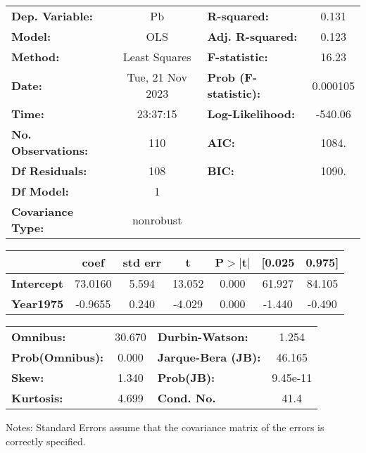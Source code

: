 \begin{center}
\begin{tabular}{lclc}
\toprule
\textbf{Dep. Variable:}    &        Pb        & \textbf{  R-squared:         } &     0.131   \\
\textbf{Model:}            &       OLS        & \textbf{  Adj. R-squared:    } &     0.123   \\
\textbf{Method:}           &  Least Squares   & \textbf{  F-statistic:       } &     16.23   \\
\textbf{Date:}             & Tue, 21 Nov 2023 & \textbf{  Prob (F-statistic):} &  0.000105   \\
\textbf{Time:}             &     23:37:15     & \textbf{  Log-Likelihood:    } &   -540.06   \\
\textbf{No. Observations:} &         110      & \textbf{  AIC:               } &     1084.   \\
\textbf{Df Residuals:}     &         108      & \textbf{  BIC:               } &     1090.   \\
\textbf{Df Model:}         &           1      & \textbf{                     } &             \\
\textbf{Covariance Type:}  &    nonrobust     & \textbf{                     } &             \\
\bottomrule
\end{tabular}
\begin{tabular}{lcccccc}
                   & \textbf{coef} & \textbf{std err} & \textbf{t} & \textbf{P$> |$t$|$} & \textbf{[0.025} & \textbf{0.975]}  \\
\midrule
\textbf{Intercept} &      73.0160  &        5.594     &    13.052  &         0.000        &       61.927    &       84.105     \\
\textbf{Year1975}  &      -0.9655  &        0.240     &    -4.029  &         0.000        &       -1.440    &       -0.490     \\
\bottomrule
\end{tabular}
\begin{tabular}{lclc}
\textbf{Omnibus:}       & 30.670 & \textbf{  Durbin-Watson:     } &    1.254  \\
\textbf{Prob(Omnibus):} &  0.000 & \textbf{  Jarque-Bera (JB):  } &   46.165  \\
\textbf{Skew:}          &  1.340 & \textbf{  Prob(JB):          } & 9.45e-11  \\
\textbf{Kurtosis:}      &  4.699 & \textbf{  Cond. No.          } &     41.4  \\
\bottomrule
\end{tabular}
\end{center}

Notes: \newline
 [1] Standard Errors assume that the covariance matrix of the errors is correctly specified.